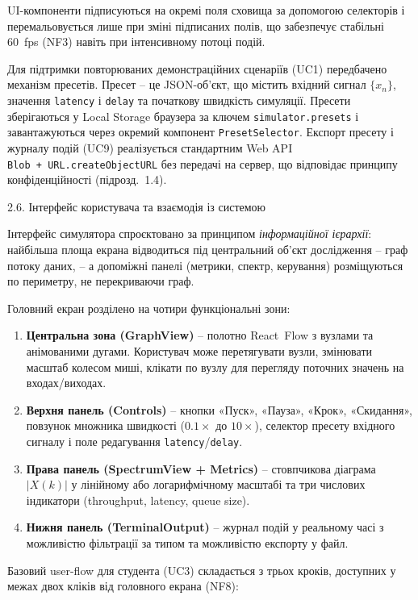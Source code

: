 \documentclass[
]{article}
\begin{document}
UI-компоненти підписуються на окремі поля сховища за допомогою
селекторів і перемальовується лише при зміні підписаних полів, що
забезпечує стабільні 60~fps (NF3) навіть при інтенсивному потоці подій.

Для підтримки повторюваних демонстраційних сценаріїв (UC1) передбачено
механізм пресетів. Пресет -- це JSON-об'єкт, що містить вхідний сигнал
\(\{ x_{n}\}\), значення \texttt{latency} і \texttt{delay} та початкову
швидкість симуляції. Пресети зберігаються у Local Storage браузера за
ключем \texttt{simulator.presets} і завантажуються через окремий
компонент \texttt{PresetSelector}. Експорт пресету і журналу подій (UC9)
реалізується стандартним Web API
\texttt{Blob}\texttt{\ +\ }\texttt{URL.createObjectURL} без передачі на
сервер, що відповідає принципу конфіденційності (підрозд.~1.4).

\protect{}\label{_Toc228121473}{}2.6. Інтерфейс користувача
та взаємодія із системою

Інтерфейс симулятора спроєктовано за принципом \emph{інформаційної
ієрархії}: найбільша площа екрана відводиться під центральний об'єкт
дослідження -- граф потоку даних, -- а допоміжні панелі (метрики,
спектр, керування) розміщуються по периметру, не перекриваючи граф.

Головний екран розділено на чотири функціональні зони:

\begin{enumerate}
\def\labelenumi{\arabic{enumi}.}
\item
  \textbf{Центральна зона (GraphView)} -- полотно React~Flow з вузлами
  та анімованими дугами. Користувач може перетягувати вузли, змінювати
  масштаб колесом миші, клікати по вузлу для перегляду поточних значень
  на входах/виходах.
\item
  \textbf{Верхня панель (Controls)} -- кнопки «Пуск», «Пауза», «Крок»,
  «Скидання», повзунок множника швидкості (\(0.1 \times\) до
  \(10 \times\)), селектор пресету вхідного сигналу і поле редагування
  \texttt{latency}/\texttt{delay}.
\item
  \textbf{Права панель (SpectrumView + Metrics)} -- стовпчикова діаграма
  \(|X(k)|\) у лінійному або логарифмічному масштабі та три числових
  індикатори (throughput, latency, queue size).
\item
  \textbf{Нижня панель (TerminalOutput)} -- журнал подій у реальному
  часі з можливістю фільтрації за типом та можливістю експорту у файл.
\end{enumerate}

Базовий user-flow для студента (UC3) складається з трьох кроків,
доступних у межах двох кліків від головного екрана (NF8):
\end{document}
